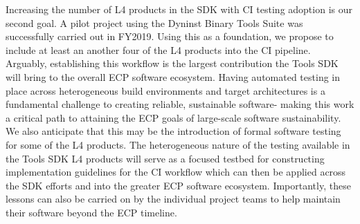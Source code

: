 Increasing the number of L4 products in the SDK with CI testing adoption is our second goal. A pilot project using the Dyninst Binary Tools Suite was successfully carried out in FY2019. Using this as a foundation, we propose to include at least an another four of the L4 products into the CI pipeline. Arguably, establishing this workflow is the largest contribution the Tools SDK will bring to the overall ECP software ecosystem. Having automated testing in place across heterogeneous build environments and target architectures is a fundamental challenge to creating reliable, sustainable software- making this work a critical path to attaining the ECP goals of large-scale software sustainability. We also anticipate that this may be the introduction of formal software testing for some of the L4 products. The heterogeneous nature of the testing available in the Tools SDK L4 products will serve as a focused testbed for constructing implementation guidelines for the CI workflow which can then be applied across the SDK efforts and into the greater ECP software ecosystem. Importantly, these lessons can also be carried on by the individual project teams to help maintain their software beyond the ECP timeline.

